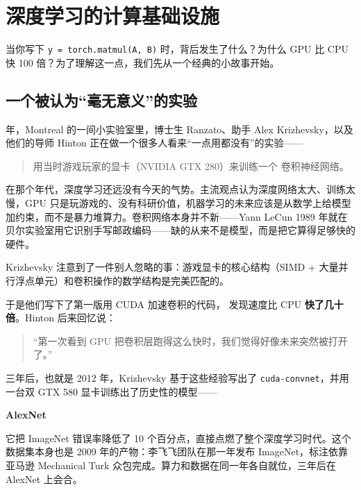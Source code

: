 \section*{深度学习的计算基础设施}

当你写下 \texttt{y = torch.matmul(A, B)} 时，背后发生了什么？为什么 GPU 
比 CPU 快 100 倍？为了理解这一点，我们先从一个经典的小故事开始。

\subsection*{一个被认为“毫无意义”的实验}


{ 年，Montreal 的一间小实验室里，博士生 Ranzato、助手 Alex Krizhevsky，以及他们的导师 Hinton 正在做一个很多人看来``一点用都没有''的实验——\par}

\begin{quote}
用当时游戏玩家的显卡（NVIDIA GTX 280）来训练一个
卷积神经网络。
\end{quote}

在那个年代，深度学习还远没有今天的气势。主流观点认为深度网络太大、训练太慢，GPU 只是玩游戏的、没有科研价值，机器学习的未来应该是从数学上给模型加约束，而不是暴力堆算力。卷积网络本身并不新——Yann LeCun 1989 年就在贝尔实验室用它识别手写邮政编码——缺的从来不是模型，而是把它算得足够快的硬件。

Krizhevsky 注意到了一件别人忽略的事：游戏显卡的核心结构（SIMD + 大量并行浮点单元）和卷积操作的数学结构是完美匹配的。

于是他们写下了第一版用 CUDA 加速卷积的代码，
发现速度比 CPU \textbf{快了几十倍}。Hinton 后来回忆说：

\begin{quote}
``第一次看到 GPU 把卷积层跑得这么快时，我们觉得好像未来突然被打开了。''
\end{quote}

三年后，也就是 2012 年，Krizhevsky 基于这些经验写出了 \texttt{cuda-convnet}，并用一台双 GTX 580 显卡训练出了历史性的模型——

\begin{center}
\textbf{AlexNet}
\end{center}

它把 ImageNet 错误率降低了 10 个百分点，直接点燃了整个深度学习时代。这个数据集本身也是 2009 年的产物：李飞飞团队在那一年发布 ImageNet，标注依靠亚马逊 Mechanical Turk 众包完成。算力和数据在同一年各自就位，三年后在 AlexNet 上会合。

